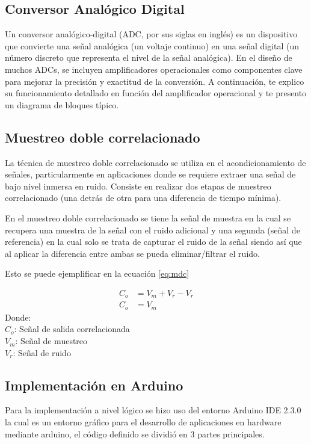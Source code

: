 \documentclass[conference]{IEEEtran}
\begin{document}
	\subsection{Conversor Analógico Digital}
	Un conversor analógico-digital (ADC, por sus siglas en inglés) es un dispositivo que convierte una señal analógica (un voltaje continuo) en una señal digital (un número discreto que representa el nivel de la señal analógica). En el diseño de muchos ADCs, se incluyen amplificadores operacionales como componentes clave para mejorar la precisión y exactitud de la conversión. A continuación, te explico su funcionamiento detallado en función del amplificador operacional y te presento un diagrama de bloques típico.
	
	\subsection{Muestreo doble correlacionado}
	La técnica de muestreo doble correlacionado se utiliza en el acondicionamiento de señales, particularmente en aplicaciones donde se requiere extraer una señal de bajo nivel inmersa en ruido. Consiste en realizar dos etapas de muestreo correlacionado (una detrás de otra para una diferencia de tiempo mínima).
	
	En el muestreo doble correlacionado se tiene la señal de muestra en la cual se recupera una muestra de la señal con el ruido adicional y una segunda (señal de referencia) en la cual solo se trata de capturar el ruido de la señal siendo así que al aplicar la diferencia entre ambas se pueda eliminar/filtrar el ruido.
	
	Esto se puede ejemplificar en la ecuación \ref{eq:mdc}
	
	\begin{align}
		C_o &= V_m + V_r - V_r \\
		\label{eq:mdc}
		C_o &= V_m
	\end{align}
	Donde:\\
	$C_o$: Señal de salida correlacionada\\
	$V_m$: Señal de muestreo \\
	$V_r$: Señal de ruido\\
	
	\subsection{Implementación en Arduino}
	
	Para la implementación a nivel lógico se hizo uso del entorno Arduino IDE 2.3.0 la cual es un entorno gráfico para el desarrollo de aplicaciones en hardware mediante arduino, el código definido se dividió en 3 partes principales.
	
\end{document}
